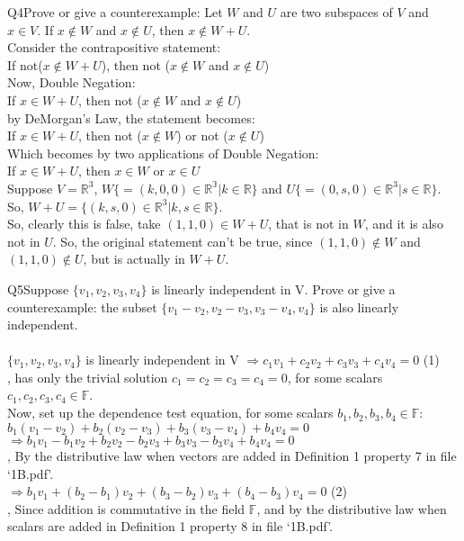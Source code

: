 \documentclass{article}
\begin{document}
Q4\quad Prove or give a counterexample: Let $W$ and $U$ are two subspaces
of $V$ and $x \in V$. If $x \notin W$ and $x \notin U$, then $x \notin
W+U$.\\

Consider the contrapositive statement:\\
If not($x \notin W+U$), then not ($x \notin W$ and $x \notin U$)\\
Now, Double Negation:\\
If $x \in W+U$, then not ($x \notin W$ and $x \notin U$)\\
by DeMorgan's Law, the statement becomes:\\
If $x \in W+U$, then not ($x \notin W$) or not ($x \notin U$)\\
Which becomes by two applications of Double Negation:\\
If $x \in W+U$, then $x \in W$ or $x \in U$\\

Suppose $V = \mathbb{R}^3$, $W \{= (k,0,0) \in \mathbb{R^3}| k \in
\mathbb{R}\}$ and
$U \{= (0,s,0) \in \mathbb{R}^3| s \in \mathbb{R}\}$.\\
So, $W+U = \{(k,s,0) \in \mathbb{R}^3| k,s \in \mathbb{R}\}$.\\

So, clearly this is false, take $(1,1,0) \in W+U$, that is not in $W$,
and it is also not in $U$. So, the original statement can't be true,
since $(1,1,0) \notin W$ and $(1,1,0) \notin U$, but is actually in $W+U$.

\newpage

Q5\quad Suppose $\{v_1 , v_2 , v_3 , v_4 \}$ is linearly independent in V. Prove or give
a counterexample: the subset
$\{v_1 − v_2 , v_2 − v_3 , v_3 − v_4 , v_4 \}$
is also linearly independent.\\

\\
$\{v_1 , v_2 , v_3 , v_4\}$ is linearly independent in V
$\Rightarrow c_1v_1+ c_2v_2 + c_3v_3  +c_4v_4 = 0$ (1) \\, has only the
trivial solution $c_1=c_2=c_3=c_4=0$, for some scalars
$c_1,c_2,c_3,c_4 \in \mathbb{F}$.\\

Now, set up the dependence test equation, for some scalars $b_1,b_2,b_3,b_4 \in \mathbb{F}$:\\
$b_1(v_1 − v_2) +b_2(v_2 − v_3) +b_3(v_3 − v_4) +b_4v_4 = 0$\\
$\Rightarrow b_1v_1 −b_1v_2 +b_2v_2 −b_2v_3 +b_3v_3 −b_3v_4 +b_4v_4 =
0$\\, By the distributive law when vectors are added in Definition 1 property 7 in file `1B.pdf'.\\
$\Rightarrow b_1v_1 +(b_2 −b_1)v_2 +(b_3 −b_2)v_3 +(b_4 −b_3)v_4 =
0$ (2)\\, Since addition is commutative in the field $\mathbb{F}$, and by the distributive law when scalars are added in Definition 1
property 8 in file `1B.pdf'.
\end{document}
